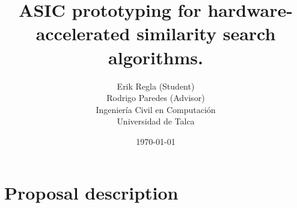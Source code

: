 \documentclass[11pt,letterpaper]{article}
\begin{document}
\pagestyle{empty}

\title{
    ASIC prototyping for hardware-accelerated similarity search algorithms.
}
\author{
Erik Regla (Student)\\
Rodrigo Paredes (Advisor)\\
Ingeniería Civil en Computación\\ 
Universidad de Talca}
\date{\today}
\maketitle


\section{Proposal description}
\end{document}
